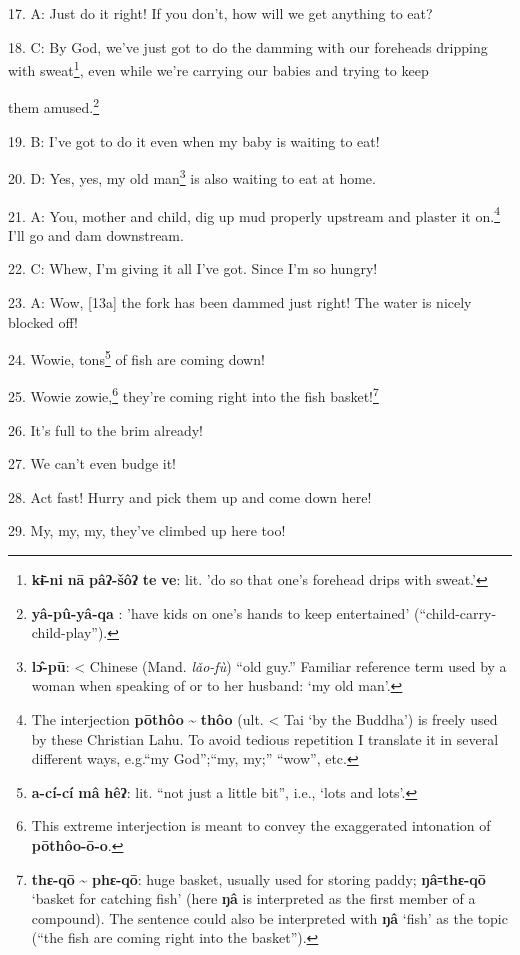 17. A: Just do it right! If you don't, how will we get anything to eat?

18. C: By God, we've just got to do the damming with our foreheads dripping with
sweat\footnote{\textbf{kɨ̄-ni} \textbf{nā} \textbf{pâʔ-šôʔ} \textbf{te} \textbf{ve}: lit. 'do so that one's forehead drips with sweat.'}, even while we're carrying our babies and trying to keep

them amused.\footnote{\textbf{yâ-pû-yâ-qa} : 'have kids on one's hands to keep entertained' (``child-carry-child-play'').}

19. B: I've got to do it even when my baby is waiting to eat!

20. D: Yes, yes, my old man\footnote{\textbf{lɔ̂-pū}: < Chinese (Mand. \textit{lǎo-fù}) ``old guy.'' Familiar reference term used by a woman when speaking of or to her husband: `my old man'.} is also waiting to eat at home.

21. A: You, mother and child, dig up mud properly upstream and plaster it on.\footnote{The interjection \textbf{pōthôo} \textasciitilde{} \textbf{thôo} (ult. < Tai `by the Buddha') is freely used by these Christian Lahu. To avoid tedious repetition I translate it in several different ways, e.g.``my God'';``my, my;'' ``wow'', etc.}
I'll go and dam downstream.

22. C: Whew, I'm giving it all I've got. Since I'm so hungry!

23. A: Wow, [13a] the fork has been dammed just right! The water is nicely blocked
off!

24. Wowie, tons\footnote{\textbf{a-cí-cí} \textbf{mâ} \textbf{hêʔ}: lit. ``not just a little bit'', i.e., `lots and lots'.} of fish are coming down!

25. Wowie zowie,\footnote{This extreme interjection is meant to convey the exaggerated intonation of \textbf{pōthôo-ō-o}.} they're coming right into the fish basket!\footnote{\textbf{thɛ-qō} \textasciitilde{} \textbf{phɛ-qō}: huge basket, usually used for storing paddy; \textbf{ŋâ꞊thɛ-qō} `basket for catching fish' (here \textbf{ŋâ} is interpreted as the first member of a compound). The sentence could also be interpreted with \textbf{ŋâ} `fish' as the topic (``the fish are coming right into the basket'').}

26. It's full to the brim already!

27. We can't even budge it!

28. Act fast! Hurry and pick them up and come down here!

29. My, my, my, they've climbed up here too!

